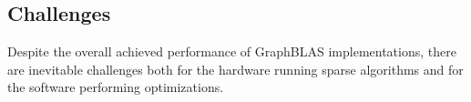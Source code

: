 






\subsection{Challenges}\label{sec:challenges}
Despite the overall achieved performance of GraphBLAS implementations, there are inevitable challenges both for the hardware running sparse algorithms and for the software performing optimizations.


